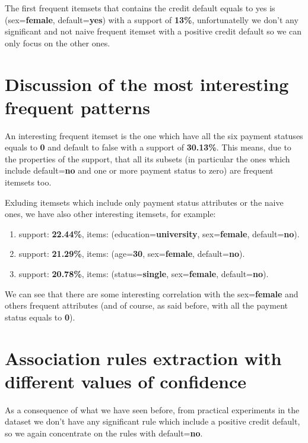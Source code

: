 \smallskip

The first frequent itemsets that contains the credit default equals to yes is (sex=\textbf{female}, default=\textbf{yes}) with a support of \textbf{13\%}, unfortunatelly we don't any significant and not naive frequent itemset with a positive credit default so we can only focus on the other ones.

\section{Discussion of the most interesting frequent patterns}

An interesting frequent itemset is the one which have all the six payment statuses equals to \textbf{0} and default to false with a support of \textbf{30.13\%}. This means, due to the properties of the support, that all its subsets (in particular the ones which include default=\textbf{no} and one or more payment status to zero) are frequent itemsets too.

\smallskip

Exluding itemsets which include only payment status attributes or the naive ones, we have also other interesting itemsets, for example:

\begin{enumerate}
  \item support: \textbf{22.44\%}, items: (education=\textbf{university}, sex=\textbf{female}, default=\textbf{no}).
  \item support: \textbf{21.29\%}, items: (age=\textbf{30}, sex=\textbf{female}, default=\textbf{no}).
  \item support: \textbf{20.78\%}, items: (status=\textbf{single}, sex=\textbf{female}, default=\textbf{no}).
\end{enumerate}

We can see that there are some interesting correlation with the sex=\textbf{female} and others frequent attributes (and of course, as said before, with all the payment status equals to \textbf{0}).

\section{Association rules extraction with different values of confidence}

As a consequence of what we have seen before, from practical experiments in the dataset we don't have any significant rule which include a positive credit default, so we again concentrate on the rules with default=\textbf{no}.

